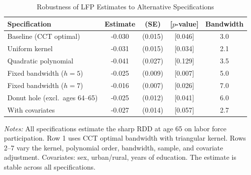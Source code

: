 \begin{table}[t]
\centering
\begin{threeparttable}
\caption{Robustness of LFP Estimates to Alternative Specifications}
\label{tab:robustness}
\begin{tabular}{lcccc}
\hline\hline
  Specification & Estimate & (SE) & [$p$-value] & Bandwidth \\
\hline
  Baseline (CCT optimal) & -0.030 & (0.015) & [0.046] & 3.0 \\
  Uniform kernel & -0.031 & (0.015) & [0.034] & 2.1 \\
  Quadratic polynomial & -0.041 & (0.027) & [0.129] & 3.5 \\
  Fixed bandwidth ($h=5$) & -0.025 & (0.009) & [0.007] & 5.0 \\
  Fixed bandwidth ($h=7$) & -0.016 & (0.007) & [0.026] & 7.0 \\
  Donut hole (excl.~ages 64--65) & -0.025 & (0.012) & [0.041] & 6.0 \\
  With covariates & -0.027 & (0.014) & [0.057] & 2.7 \\
\hline\hline
\end{tabular}
\begin{tablenotes}
\item \textit{Notes:} All specifications estimate the sharp RDD at age 65 on labor force participation. Row 1 uses CCT optimal bandwidth with triangular kernel. Rows 2--7 vary the kernel, polynomial order, bandwidth, sample, and covariate adjustment. Covariates: sex, urban/rural, years of education. The estimate is stable across all specifications.
\end{tablenotes}
\end{threeparttable}
\end{table}
